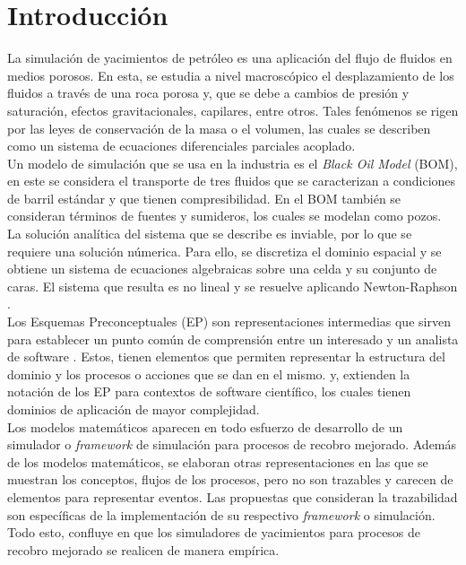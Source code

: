 \chapter{Introducci\'{o}n}

La simulación de yacimientos de petróleo es una aplicación del flujo de fluidos en medios porosos. En esta, se estudia a nivel macroscópico el desplazamiento de los fluidos a través de una roca porosa y, que se debe a cambios de presión y saturación, efectos gravitacionales, capilares, entre otros. Tales fenómenos se rigen por las leyes de conservación de la masa o el volumen, las cuales se describen como un sistema de ecuaciones diferenciales parciales acoplado.\\

Un modelo de simulación que se usa en la industria es el \textit{Black Oil Model} (BOM), en este se considera el transporte de tres fluidos que se caracterizan a condiciones de barril estándar y que tienen compresibilidad. En el BOM también se consideran términos de fuentes y sumideros, los cuales se modelan como pozos. La solución analítica del sistema que se describe es inviable, por lo que se requiere una solución númerica. Para ello, se discretiza el dominio espacial y se obtiene un sistema de ecuaciones algebraicas sobre una celda y su conjunto de caras. El sistema que resulta es no lineal y se resuelve aplicando Newton-Raphson \citep{atkinson2008introduction}.\\

Los Esquemas Preconceptuales (EP) son representaciones intermedias que sirven para establecer un punto común de comprensión entre un interesado y un analista de software \citep{zapata2007phd}. Estos, tienen elementos que permiten representar la estructura del dominio y los procesos o acciones que se dan en el mismo. \cite{JCalle} y, \cite{norena2018det} extienden la notación de los EP para contextos de software científico, los cuales tienen dominios de aplicación de mayor complejidad.\\

Los modelos matemáticos aparecen en todo esfuerzo de desarrollo de un simulador o \textit{framework} de simulación para procesos de recobro mejorado. Además de los modelos matemáticos, se elaboran otras representaciones en las que se muestran los conceptos, flujos de los procesos, pero no son trazables y carecen de elementos para representar eventos. Las propuestas que consideran la trazabilidad son específicas de la implementación de su respectivo \textit{framework} o simulación. Todo esto, confluye en que los simuladores de yacimientos para procesos de recobro mejorado se realicen de manera empírica.\\

